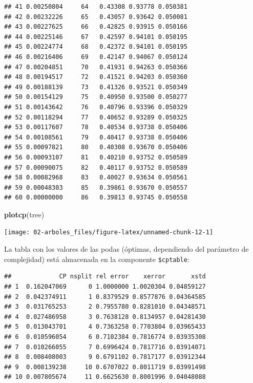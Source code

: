 \documentclass[
]{book}
\newenvironment{Shaded}{\begin{snugshade}}{\end{snugshade}}
\newcommand{\DecValTok}[1]{\textcolor[rgb]{0.00,0.00,0.81}{#1}}
\newcommand{\KeywordTok}[1]{\textcolor[rgb]{0.13,0.29,0.53}{\textbf{#1}}}
\newcommand{\NormalTok}[1]{#1}
\newcommand{\OperatorTok}[1]{\textcolor[rgb]{0.81,0.36,0.00}{\textbf{#1}}}
\theoremstyle{break}
\theoremstyle{definition}
\theoremstyle{definition}
\theoremstyle{definition}
\theoremstyle{remark}
\begin{document}
\begin{verbatim}
## 41 0.00250804     64   0.43308 0.93778 0.050381
## 42 0.00232226     65   0.43057 0.93642 0.050081
## 43 0.00227625     66   0.42825 0.93915 0.050166
## 44 0.00225146     67   0.42597 0.94101 0.050195
## 45 0.00224774     68   0.42372 0.94101 0.050195
## 46 0.00216406     69   0.42147 0.94067 0.050124
## 47 0.00204851     70   0.41931 0.94263 0.050366
## 48 0.00194517     72   0.41521 0.94203 0.050360
## 49 0.00188139     73   0.41326 0.93521 0.050349
## 50 0.00154129     75   0.40950 0.93500 0.050277
## 51 0.00143642     76   0.40796 0.93396 0.050329
## 52 0.00118294     77   0.40652 0.93289 0.050325
## 53 0.00117607     78   0.40534 0.93738 0.050406
## 54 0.00108561     79   0.40417 0.93738 0.050406
## 55 0.00097821     80   0.40308 0.93670 0.050406
## 56 0.00093107     81   0.40210 0.93752 0.050589
## 57 0.00090075     82   0.40117 0.93752 0.050589
## 58 0.00082968     83   0.40027 0.93634 0.050561
## 59 0.00048303     85   0.39861 0.93670 0.050557
## 60 0.00000000     86   0.39813 0.93745 0.050558
\end{verbatim}

\begin{Shaded}
\begin{Highlighting}[]
\KeywordTok{plotcp}\NormalTok{(tree)}
\end{Highlighting}
\end{Shaded}

\begin{center}\texttt{[image: 02-arboles\_files/figure-latex/unnamed-chunk-12-1]} \end{center}

La tabla con los valores de las podas (óptimas, dependiendo del parámetro de complejidad)
está almacenada en la componente \texttt{\$cptable}:

\begin{Shaded}
\end{Shaded}

\begin{verbatim}
##             CP nsplit rel error    xerror       xstd
## 1  0.162047069      0 1.0000000 1.0020304 0.04859127
## 2  0.042374911      1 0.8379529 0.8577876 0.04364585
## 3  0.031765253      2 0.7955780 0.8281010 0.04348571
## 4  0.027486958      3 0.7638128 0.8134957 0.04281430
## 5  0.013043701      4 0.7363258 0.7703804 0.03965433
## 6  0.010596054      6 0.7102384 0.7816774 0.03935308
## 7  0.010266055      7 0.6996424 0.7817716 0.03914071
## 8  0.008408003      9 0.6791102 0.7817177 0.03912344
## 9  0.008139238     10 0.6707022 0.8011719 0.03991498
## 10 0.007805674     11 0.6625630 0.8001996 0.04048088
\end{verbatim}
\end{document}
